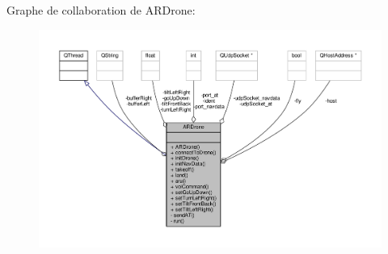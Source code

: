 Graphe de collaboration de A\-R\-Drone\-:
\nopagebreak
\begin{figure}[H]
\begin{center}
\leavevmode
\includegraphics[width=350pt]{class_a_r_drone__coll__graph}
\end{center}
\end{figure}
